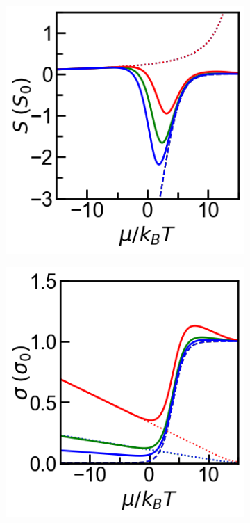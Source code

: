 \documentclass{article}
\begin{document}
\begin{figure}[ht]
\centering
\begin{subfigure}[b]{0.33\textwidth}
  \includegraphics[width=\textwidth]{../Seebeck.png}
\end{subfigure}
\begin{subfigure}[b]{0.33\textwidth}
  \includegraphics[width=\textwidth]{../Conductivity.png}

\end{subfigure}
\end{figure}
\end{document}
